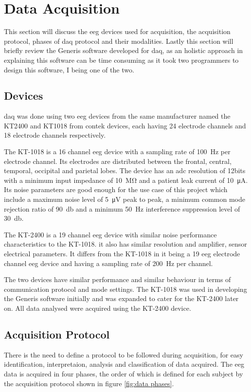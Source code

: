 \documentclass[10pt]{article}
\begin{document}
\section{Data Acquisition}\label{sec:DAQ}
This section will discuss the \gls{eeg} devices used for acquisition, the 
acquisition protocol, phases of \gls{daq} protocol and their modalities. Lastly 
this section will briefly review the Generis software developed for \gls{daq}, as 
an holistic approach in explaining this software can be time consuming as it took 
two programmers to design this software, I being one of the two.

\subsection{Devices}\label{ssce:EEG devices}
\gls{daq} was done using two \gls{eeg} devices from the same 
manufacturer named the KT2400 and KT1018 from contek devices, each having 24 
electrode channels and 18 electrode channels respectively.

The KT-1018 is a 16 channel \gls{eeg} device with a sampling rate of 
\SI{100}{\hertz} per electrode channel. Its electrodes are distributed between 
the frontal, central, temporal, occipital and parietal lobes. The device has an 
\gls{adc} resolution of 12bits with a minimum input impedance of 
\SI{10}{\mega\ohm} and a patient leak current of \SI{10}{\micro\ampere}. Its 
noise parameters are good enough for the use case of this project which include 
a maximum noise level of \SI{5}{\micro\volt} peak to peak, a minimum common mode 
rejection ratio of \SI{90}{\decibel} and a minimum \SI{50}{\hertz} interference 
suppression level of \SI{30}{\decibel}.

The KT-2400 is a 19 channel \gls{eeg} device with similar noise performance 
characteristics to the KT-1018. it also has similar resolution and amplifier, sensor 
electrical parameters. It differs from the KT-1018  in it being a 19 \gls{eeg} electrode 
channel \gls{eeg} device and having a sampling rate of \SI{200}{\hertz} per 
channel.

The two devices have similar performance and similar behaviour in terms of 
communication protocol and mode settings. The KT-1018 was used in developing the 
Generis software initially and was expanded to cater for the KT-2400 later on. All 
data analysed were acquired using the KT-2400 device.

\subsection{Acquisition Protocol}\label{ssec:DAQ protocol}
There is the need to define a protocol to be followed during acquisition, for easy 
identification, interpretaion, analysis and classification of data acquired. The 
\gls{eeg} data is acquired in four phases, the order of which is defined for each 
subject by the acquisition protocol shown in figure \ref{fig:data phases}.
\end{document}
